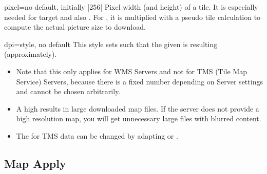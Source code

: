 \clearpage
\begin{docMrcKey}[supply]{pixel}{=}{no default, initially |256|}
  Pixel width (and height) of a tile. It is especially needed for
  target  and also .
  For , it is multiplied with a pseudo tile calculation
  to compute the actual picture size to download.
\end{docMrcKey}


\begin{docMrcKey}[supply]{dpi}{=}{style, no default}
  This style sets  such that the given 
  is resulting (approximately).
  \begin{itemize}
  \item Note that this only applies for WMS Servers and not for
    TMS (Tile Map Service) Servers,
    because there  is a fixed number depending on
    Server settings and cannot be chosen arbitrarily.
  \item A high  results in large downloaded map files.
    If the server does not provide a high resolution map, you will get
    unnecessary large files with blurred content.
  \item The  for TMS data can be changed by adapting
     or .
  \end{itemize}

\begin{dispExample}
\end{dispExample}

\end{docMrcKey}





\subsection{Map Apply}

